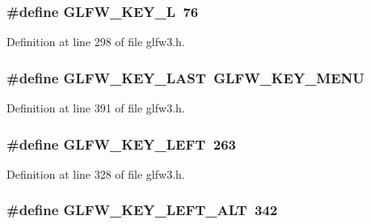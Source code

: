 \subsubsection[{G\+L\+F\+W\+\_\+\+K\+E\+Y\+\_\+\+L}]{\setlength{\rightskip}{0pt plus 5cm}\#define G\+L\+F\+W\+\_\+\+K\+E\+Y\+\_\+\+L~76}\label{group__keys_gaaa8b54a13f6b1eed85ac86f82d550db2}


Definition at line 298 of file glfw3.\+h.

\hypertarget{group__keys_ga442cbaef7bfb9a4ba13594dd7fbf2789}{}
\subsubsection[{G\+L\+F\+W\+\_\+\+K\+E\+Y\+\_\+\+L\+A\+S\+T}]{\setlength{\rightskip}{0pt plus 5cm}\#define G\+L\+F\+W\+\_\+\+K\+E\+Y\+\_\+\+L\+A\+S\+T~{\bf G\+L\+F\+W\+\_\+\+K\+E\+Y\+\_\+\+M\+E\+N\+U}}\label{group__keys_ga442cbaef7bfb9a4ba13594dd7fbf2789}


Definition at line 391 of file glfw3.\+h.

\hypertarget{group__keys_gae12a010d33c309a67ab9460c51eb2462}{}
\subsubsection[{G\+L\+F\+W\+\_\+\+K\+E\+Y\+\_\+\+L\+E\+F\+T}]{\setlength{\rightskip}{0pt plus 5cm}\#define G\+L\+F\+W\+\_\+\+K\+E\+Y\+\_\+\+L\+E\+F\+T~263}\label{group__keys_gae12a010d33c309a67ab9460c51eb2462}


Definition at line 328 of file glfw3.\+h.

\hypertarget{group__keys_ga7f27dabf63a7789daa31e1c96790219b}{}
\subsubsection[{G\+L\+F\+W\+\_\+\+K\+E\+Y\+\_\+\+L\+E\+F\+T\+\_\+\+A\+L\+T}]{\setlength{\rightskip}{0pt plus 5cm}\#define G\+L\+F\+W\+\_\+\+K\+E\+Y\+\_\+\+L\+E\+F\+T\+\_\+\+A\+L\+T~342}\label{group__keys_ga7f27dabf63a7789daa31e1c96790219b}



